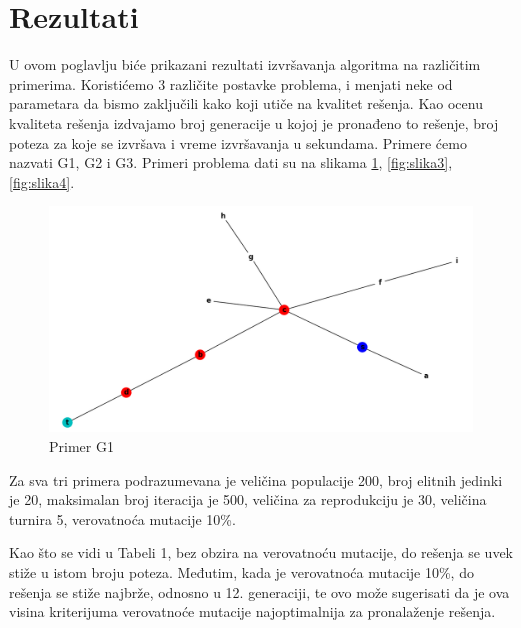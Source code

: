 \documentclass[12pt]{article}
\begin{document}
	\section{Rezultati}
	U ovom poglavlju biće prikazani rezultati izvršavanja algoritma na različitim primerima. Koristićemo 3 različite postavke problema, i menjati neke od parametara da bismo zaključili kako koji utiče na kvalitet rešenja. Kao ocenu kvaliteta rešenja izdvajamo broj generacije u kojoj je pronađeno to rešenje, broj poteza za koje se izvršava i vreme izvršavanja u sekundama. Primere ćemo nazvati G1, G2 i G3. Primeri problema dati su na slikama \ref{fig:slika2}, \ref{fig:slika3}, \ref{fig:slika4}.  
	
		\begin{figure}[h]
		\begin{center}
			\includegraphics[scale=0.4]{g1.png}
		\end{center}
		\caption{Primer G1}
		\label{fig:slika2}
	\end{figure}
	


	Za sva tri primera podrazumevana je veličina populacije 200, broj elitnih jedinki je 20, maksimalan broj iteracija je 500, veličina za reprodukciju je 30, veličina turnira 5, verovatnoća mutacije 10\%.
	\par Kao što se vidi u Tabeli 1, bez obzira na verovatnoću mutacije, do rešenja se uvek stiže u istom broju poteza. Međutim, kada je verovatnoća mutacije 10\%, do rešenja se stiže najbrže, odnosno u 12. generaciji, te ovo može sugerisati da je ova visina kriterijuma verovatnoće mutacije najoptimalnija za pronalaženje rešenja. 
	
\end{document}
